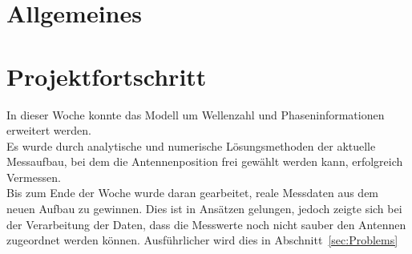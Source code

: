 \documentclass[a4paper,12pt,fleqn]{article}
\begin{document}
\setlength{\headheight}{36pt}

\begin{titlepage}



\end{titlepage}

\section[Allgemeines]{Allgemeines}


\section[Fortschritt]{Projektfortschritt}
In dieser Woche konnte das Modell um Wellenzahl und Phaseninformationen erweitert werden.\\
Es wurde durch analytische und numerische Lösungsmethoden der aktuelle Messaufbau, bei dem die Antennenposition frei gewählt werden kann, erfolgreich Vermessen.\\
Bis zum Ende der Woche wurde daran gearbeitet, reale Messdaten aus dem neuen Aufbau zu gewinnen. Dies ist in Ansätzen gelungen, jedoch zeigte sich bei der Verarbeitung der Daten, dass die Messwerte noch nicht sauber den Antennen zugeordnet werden können. Ausführlicher wird dies in Abschnitt~\ref{sec:Problems}

\end{document}
